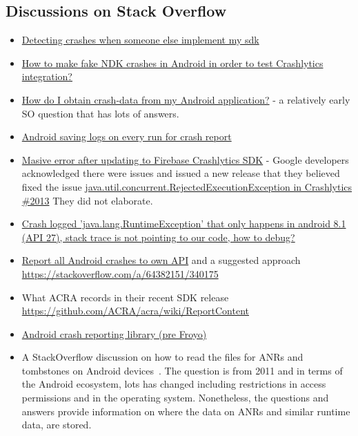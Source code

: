 \subsection{Discussions on Stack Overflow}
\begin{itemize}
    \item \href{https://stackoverflow.com/questions/66471628/detecting-crashes-when-someone-else-implement-my-sdk}{Detecting crashes when someone else implement my sdk}
    \item \href{https://stackoverflow.com/questions/67138663/how-to-make-fake-ndk-crashes-in-android-in-order-to-test-crashlytics-integration}{How to make fake NDK crashes in Android in order to test Crashlytics integration?}
    \item \href{How do I obtain crash-data from my Android application?}{How do I obtain crash-data from my Android application?} - a relatively early SO question that has lots of answers.
    \item \href{https://stackoverflow.com/questions/20763011/android-saving-logs-on-every-run-for-crash-report}{Android saving logs on every run for crash report}
    \item \href{https://stackoverflow.com/questions/63190868/masive-error-after-updating-to-firebase-crashlytics-sdk}{Masive error after updating to Firebase Crashlytics SDK} - Google developers acknowledged there were issues and issued a new release that they believed fixed the issue \href{https://github.com/firebase/firebase-android-sdk/issues/2013}{java.util.concurrent.RejectedExecutionException in Crashlytics \#2013} They did not elaborate.
    \item \href{https://stackoverflow.com/questions/64381093/crash-logged-java-lang-runtimeexception-that-only-happens-in-android-8-1-api}{Crash logged 'java.lang.RuntimeException' that only happens in android 8.1 (API 27), stack trace is not pointing to our code, how to debug?}
    \item \href{https://stackoverflow.com/questions/59926756/report-all-android-crashes-to-own-api}{Report all Android crashes to own API} and a suggested approach \url{https://stackoverflow.com/a/64382151/340175}
    \item What ACRA records in their recent SDK release \url{https://github.com/ACRA/acra/wiki/ReportContent}
    \item \href{https://stackoverflow.com/questions/3378550/android-crash-reporting-library-pre-froyo}{Android crash reporting library (pre Froyo)}
    \item A StackOverflow discussion on how to read the files for ANRs and tombstones on Android devices~\citep{learner2011_so_how_to_access_anrs_and_tombstones}. The question is from 2011 and in terms of the Android ecosystem, lots has changed including restrictions in access permissions and in the operating system. Nonetheless, the questions and answers provide information on where the data on ANRs and similar runtime data, are stored.

\end{itemize}
